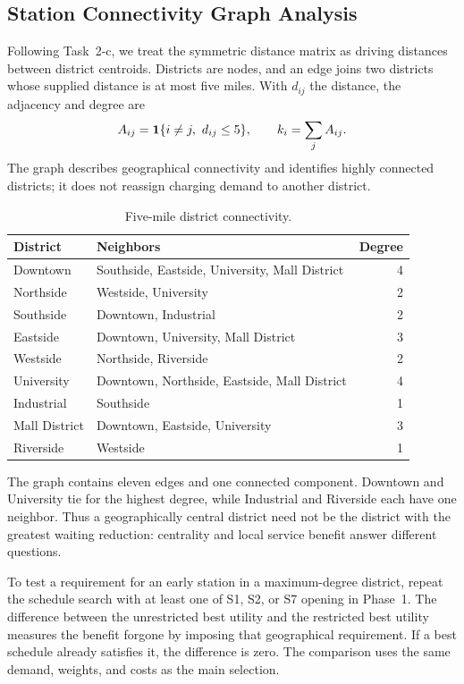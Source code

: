 \documentclass[12pt]{article}
\begin{document}
\subsection{Station Connectivity Graph Analysis}
\label{subsec:connectivity}
Following Task~2-c, we treat the symmetric distance matrix as driving distances between
district centroids. Districts are nodes, and an edge joins two districts whose supplied
distance is at most five miles. With $d_{ij}$ the distance, the adjacency and degree are
\begin{equation}
A_{ij}=\mathbf 1\{i\ne j,\ d_{ij}\le5\},\qquad k_i=\sum_j A_{ij}.
\label{eq:graph}
\end{equation}
The graph describes geographical connectivity and identifies highly connected districts;
it does not reassign charging demand to another district.
\begin{table}[htbp]\centering\small
\caption{Five-mile district connectivity.}\label{tab:connectivity}
\begin{tabular}{@{}lp{}r@{}}\toprule
District&Neighbors&Degree\\\midrule
Downtown&Southside, Eastside, University, Mall District&4\\
Northside&Westside, University&2\\
Southside&Downtown, Industrial&2\\
Eastside&Downtown, University, Mall District&3\\
Westside&Northside, Riverside&2\\
University&Downtown, Northside, Eastside, Mall District&4\\
Industrial&Southside&1\\
Mall District&Downtown, Eastside, University&3\\
Riverside&Westside&1\\\bottomrule
\end{tabular}\end{table}

The graph contains eleven edges and one connected component. Downtown and University
tie for the highest degree, while Industrial and Riverside each have one neighbor.
Thus a geographically central district need not be the district with the greatest
waiting reduction: centrality and local service benefit answer different questions.

To test a requirement for an early station in a maximum-degree district, repeat the
schedule search with at least one of S1, S2, or S7 opening in Phase~1. The difference
between the unrestricted best utility and the restricted best utility measures the
benefit forgone by imposing that geographical requirement. If a best schedule already
satisfies it, the difference is zero. The comparison uses the same demand, weights,
and costs as the main selection.
\end{document}
